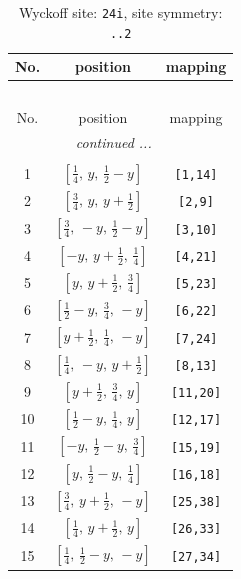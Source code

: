 \documentclass[fleqn,8pt]{jsarticle}
\begin{document}
\begin{longtable}{ccc}
\caption{Wyckoff site: {\tt 24i}, site symmetry: {\tt ..2}}
 \\
 \hline \hline
No. & position & mapping \\ \hline \endfirsthead

\multicolumn{2}{l}{\tablename\ \thetable{}} \\
 \hline \hline
No. & position & mapping \\ \hline \endhead

 \hline \hline
\multicolumn{2}{r}{\footnotesize\it continued ...} \\ \endfoot

 \hline \hline
\multicolumn{2}{r}{} \\ \endlastfoot

1 & $\left[ \frac{1}{4},\, y,\, \frac{1}{2} - y \right]$ & {\tt [1,14]} \\ \hline
2 & $\left[ \frac{3}{4},\, y,\, y + \frac{1}{2} \right]$ & {\tt [2,9]} \\ \hline
3 & $\left[ \frac{3}{4},\, - y,\, \frac{1}{2} - y \right]$ & {\tt [3,10]} \\ \hline
4 & $\left[ - y,\, y + \frac{1}{2},\, \frac{1}{4} \right]$ & {\tt [4,21]} \\ \hline
5 & $\left[ y,\, y + \frac{1}{2},\, \frac{3}{4} \right]$ & {\tt [5,23]} \\ \hline
6 & $\left[ \frac{1}{2} - y,\, \frac{3}{4},\, - y \right]$ & {\tt [6,22]} \\ \hline
7 & $\left[ y + \frac{1}{2},\, \frac{1}{4},\, - y \right]$ & {\tt [7,24]} \\ \hline
8 & $\left[ \frac{1}{4},\, - y,\, y + \frac{1}{2} \right]$ & {\tt [8,13]} \\ \hline
9 & $\left[ y + \frac{1}{2},\, \frac{3}{4},\, y \right]$ & {\tt [11,20]} \\ \hline
10 & $\left[ \frac{1}{2} - y,\, \frac{1}{4},\, y \right]$ & {\tt [12,17]} \\ \hline
11 & $\left[ - y,\, \frac{1}{2} - y,\, \frac{3}{4} \right]$ & {\tt [15,19]} \\ \hline
12 & $\left[ y,\, \frac{1}{2} - y,\, \frac{1}{4} \right]$ & {\tt [16,18]} \\ \hline
13 & $\left[ \frac{3}{4},\, y + \frac{1}{2},\, - y \right]$ & {\tt [25,38]} \\ \hline
14 & $\left[ \frac{1}{4},\, y + \frac{1}{2},\, y \right]$ & {\tt [26,33]} \\ \hline
15 & $\left[ \frac{1}{4},\, \frac{1}{2} - y,\, - y \right]$ & {\tt [27,34]} \\ \hline

\end{longtable}
\end{document}
